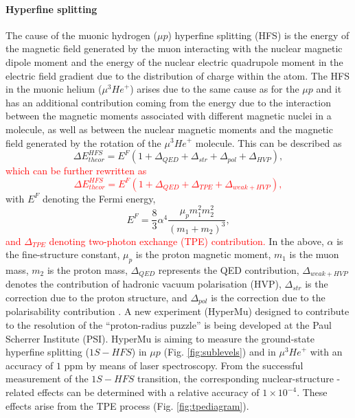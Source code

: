 \documentclass[12pt]{article}
\begin{document}
\paragraph{Hyperfine splitting}
The cause of the muonic hydrogen (${\mu}p$) hyperfine splitting (HFS) is the energy of the magnetic field generated by the muon interacting with the nuclear magnetic dipole moment and the energy of the nuclear electric quadrupole moment in the electric field gradient due to the distribution of charge within the atom. The HFS in the muonic helium (${\mu}^3 {He}^{+}$) arises due to the same cause as for the ${\mu}p$ and it has an additional contribution coming from the energy due to the interaction between the magnetic moments associated with different magnetic nuclei in a molecule, as well as between the nuclear magnetic moments and the magnetic field generated by the rotation of the ${\mu}^3 {He}^{+}$ molecule. This can be described as
\begin{equation}\label{eqn:HFS}
\Delta{E}^{HFS}_{theor} = E^F(1 + {\Delta}_{QED} + {\Delta}_{str} + {\Delta}_{pol} + {\Delta}_{HVP}),
\end{equation} 
\textcolor{red}{
which can be further rewritten \cite{proposal} as
\begin{equation}
\Delta{E}^{HFS}_{theor} = E^F(1 + {\Delta}_{QED} + {\Delta}_{TPE} + {\Delta}_{weak + HVP}),
\end{equation}}
with $E^F$ denoting the Fermi energy,
\begin{equation}
E^F = \frac{8}{3}{\alpha}^4 \frac{{\mu}_p{m_1^2}{m_2^2}}{(m_1+m_2)^3},
\end{equation}
\textcolor{red}{
and ${\Delta}_{TPE}$ denoting two-photon exchange (TPE) contribution.} In the above, $\alpha$ is the fine-structure constant, ${\mu}_p$ is the proton magnetic moment, $m_1$ is the muon mass, $m_2$ is the proton mass, ${\Delta}_{QED}$ represents the QED contribution, ${\Delta}_{weak+HVP}$ denotes the contribution of hadronic vacuum polarisation (HVP), ${\Delta}_{str}$ is the correction due to the proton structure, and ${\Delta}_{pol}$ is the correction due to the polarisability contribution \cite{martynenko}. A new experiment (HyperMu) designed to contribute to the resolution of the ``proton-radius puzzle'' is being developed at the Paul Scherrer Institute (PSI). HyperMu is aiming to measure the ground-state hyperfine splitting ($1S - HFS$) in $\mu{p}$ (Fig. \ref{fig:sublevels}) and in $\mu^3{He}^{+}$ with an accuracy of $1$ ppm by means of laser spectroscopy. From the successful measurement of the $1S-HFS$ transition, the corresponding nuclear-structure - related effects can be determined with a relative accuracy of $1 \times 10^{-4}$. These effects arise from the TPE process (Fig. \ref{fig:tpediagram}). 
\end{document}
